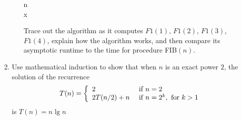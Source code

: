 \documentclass[12pt]{report}
\newcommand{\choicelabel}{\alph*)}
\begin{document}
\begin{enumerate}[label=\arabic*.]
\begin{enumerate}[label=\arabic{enumi}\choicelabel]
\begin{algorithm}[H]
				\caption{}\label{alg:fib1}
				\begin{algorithmic}[1]
						\Return n
					\Else~\Return {}
					\EndIf
				\EndFunction\\
						\State {}
					\EndIf
					\State \Return x
				\EndFunction
				\end{algorithmic}
			\end{algorithm}
		\noindent Trace out the algorithm as it computes $F1(1)$, $F1(2)$, $F1(3)$, $F1(4)$, explain how the algorithm works, and then compare its asymptotic runtime to the time for procedure FIB$(n)$.
	\end{enumerate}
	\item Use mathematical induction to show that when $n$ is an exact power $2$, the solution of the recurrence \[ T(n)=\left\{ \begin{array}{ll}
		2&$\mbox{ if }$ n=2\\
		2T(n/2)+n&$\mbox{ if }$ n=2^{k},\mbox{ for }k>1
	\end{array} \right. \] is $T(n)=n\lg n$
\end{enumerate}
\end{document}
